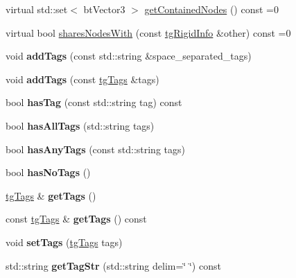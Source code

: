 \begin{DoxyCompactItemize}
\item 
virtual std\-::set$<$ bt\-Vector3 $>$ \hyperlink{classtg_rigid_info_a35b84de1b721ab94536f4313b64b84da}{get\-Contained\-Nodes} () const =0
\item 
virtual bool \hyperlink{classtg_rigid_info_a9c3c7d1827ffd68214f76a1b19278a9b}{shares\-Nodes\-With} (const \hyperlink{classtg_rigid_info}{tg\-Rigid\-Info} \&other) const =0
\item 
\hypertarget{classtg_taggable_af0b8f1729653b0b90d2fecbd51163612}{void {\bfseries add\-Tags} (const std\-::string \&space\-\_\-separated\-\_\-tags)}\label{classtg_taggable_af0b8f1729653b0b90d2fecbd51163612}

\item 
\hypertarget{classtg_taggable_af28e3fe1a7e4eb28772dc006d575dd1f}{void {\bfseries add\-Tags} (const \hyperlink{classtg_tags}{tg\-Tags} \&tags)}\label{classtg_taggable_af28e3fe1a7e4eb28772dc006d575dd1f}

\item 
\hypertarget{classtg_taggable_ae31f65869c8887bfeb34a344902c4d5b}{bool {\bfseries has\-Tag} (const std\-::string tag) const }\label{classtg_taggable_ae31f65869c8887bfeb34a344902c4d5b}

\item 
\hypertarget{classtg_taggable_a33b77b1075171b63f673965687b2e844}{bool {\bfseries has\-All\-Tags} (std\-::string tags)}\label{classtg_taggable_a33b77b1075171b63f673965687b2e844}

\item 
\hypertarget{classtg_taggable_af14af28fa98021c4f20a5e8f2ddd5606}{bool {\bfseries has\-Any\-Tags} (const std\-::string tags)}\label{classtg_taggable_af14af28fa98021c4f20a5e8f2ddd5606}

\item 
\hypertarget{classtg_taggable_adff345e116e16420c701a748ff8f995f}{bool {\bfseries has\-No\-Tags} ()}\label{classtg_taggable_adff345e116e16420c701a748ff8f995f}

\item 
\hypertarget{classtg_taggable_acf1d7fa9df8f374f25015c4080902681}{\hyperlink{classtg_tags}{tg\-Tags} \& {\bfseries get\-Tags} ()}\label{classtg_taggable_acf1d7fa9df8f374f25015c4080902681}

\item 
\hypertarget{classtg_taggable_ae70d7d3b45301665bc363b0ed8b9b292}{const \hyperlink{classtg_tags}{tg\-Tags} \& {\bfseries get\-Tags} () const }\label{classtg_taggable_ae70d7d3b45301665bc363b0ed8b9b292}

\item 
\hypertarget{classtg_taggable_a5492888e4e4da4cca6261070b5726adf}{void {\bfseries set\-Tags} (\hyperlink{classtg_tags}{tg\-Tags} tags)}\label{classtg_taggable_a5492888e4e4da4cca6261070b5726adf}

\item 
\hypertarget{classtg_taggable_a346d66b066d2d9eb1eadba01da43749f}{std\-::string {\bfseries get\-Tag\-Str} (std\-::string delim=\char`\"{} \char`\"{}) const }\label{classtg_taggable_a346d66b066d2d9eb1eadba01da43749f}

\end{DoxyCompactItemize}
